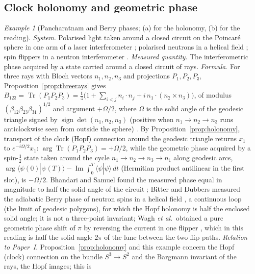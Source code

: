 \documentclass[aps,pra,onecolumn,superscriptaddress,nofootinbib,10pt]{revtex4-2}
\theoremstyle{definition}
\theoremstyle{remark}
\newtheorem{example}[theorem]{Example}
\newcommand{\im}{\operatorname{Im}}
\begin{document}
\subsection{Clock holonomy and geometric phase}

\begin{example}[Pancharatnam and Berry phases; (a) for the holonomy, (b) for the reading]\label{ex:pancharatnam}
\emph{System.}  Polarised light taken around a closed circuit on the Poincar\'e sphere in one arm of a
laser interferometer \cite{ex-Pancharatnam56,ex-BS88}; polarised neutrons in a helical field \cite{ex-BD87}; spin
flippers in a neutron interferometer \cite{ex-Wagh97}.
\emph{Measured quantity.}  The interferometric phase acquired by a state carried around a closed circuit
of rays.
\emph{Formula.}  For three rays with Bloch vectors $n_1,n_2,n_3$ and projections $P_1,P_2,P_3$,
Proposition~\ref{prop:threerays} gives
$B_{123}=\operatorname{Tr}(P_1P_2P_3)=\tfrac14\bigl(1+\sum_{i<j}n_i\!\cdot n_j+i\,n_1\!\cdot(n_2\times n_3)\bigr)$, of modulus
$(\beta_{12}\beta_{23}\beta_{31})^{1/2}$ and argument $+\Omega/2$, where $\Omega$ is the solid angle of the geodesic
triangle signed by $\operatorname{sign}\det(n_1,n_2,n_3)$ (positive when $n_1\to n_2\to n_3$ runs anticlockwise seen
from outside the sphere) \cite{ex-SB88,ex-MS93}.  By Proposition~\ref{prop:holonomy}, transport of the clock
(Hopf) connection around the geodesic triangle returns $x_1$ to $e^{-i\Omega/2}x_1$: $\arg\operatorname{Tr}(P_1P_2P_3)=+\Omega/2$, while the geometric phase
acquired by a spin-$\tfrac12$ state taken around the cycle $n_1\to n_2\to n_3\to n_1$ along geodesic arcs,
$\arg\langle\psi(0)|\psi(T)\rangle-\im\int_0^T\langle\psi|\dot\psi\rangle\,dt$ (Hermitian product antilinear in the first slot), is $-\Omega/2$.  Bhandari and Samuel found the measured phase equal in
magnitude to half the solid angle of the circuit \cite{ex-BS88}; Bitter and Dubbers measured the adiabatic
Berry phase \cite{ex-Berry84} of neutron spins in a helical field \cite{ex-BD87}, a continuous loop (the limit
of geodesic polygons), for which the Hopf holonomy is half the enclosed solid angle; it is not a three-point
invariant; Wagh \emph{et al.}\ obtained a pure
geometric phase shift of $\pi$ by reversing the current in one flipper \cite{ex-Wagh97}, which in this reading
is half the solid angle $2\pi$ of the lune between the two flip paths.
\emph{Relation to Paper~I.}  Proposition~\ref{prop:holonomy} and this example concern the Hopf (clock)
connection on the bundle $S^3\to S^2$ and the Bargmann invariant of the rays, the Hopf images; this is

\end{example}
\end{document}
